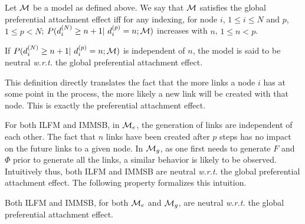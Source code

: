 \begin{definition}
Let $\mathcal{M}$ be a model as defined above. We say that $\mathcal{M}$ satisfies the global preferential attachment effect iff for any indexing, for node $i$, $1 \leq i \leq N$ and $p$, $1 \leq p < N$; 
$P(d_i^{(N)} \geq n+1 | d_i^{(p)} = n; \M)$ increases with $n$, $1 \leq n < p$.

If $P(d_i^{(N)} \geq n+1 | d_i^{(p)} = n; \M)$ is independent of $n$, the model is said to be neutral \textit{w.r.t.} the global preferential attachment effect.

\end{definition}

This definition directly translates the fact that the more links a node $i$ has at some point in the process, the more likely a new link will be created with that node. This is exactly the preferential attachment effect.

For both ILFM and IMMSB, in $\mathcal{M}_e$, the generation of links are independent of each other. The fact that $n$ links have been created after $p$ steps has no impact on the future links to a given node. In $\mathcal{M}_g$, as one first needs to generate $F$ and $\Phi$ prior to generate all the links, a similar behavior is likely to be observed. Intuitively thus, both ILFM and IMMSB are neutral \textit{w.r.t.} the global preferential attachment effect. The following property formalizes this intuition.


\begin{proposition} \label{th:mg_glob}
Both ILFM and IMMSB, for both $\mathcal{M}_e$ and $\mathcal{M}_g$, are neutral \textit{w.r.t.} the global preferential attachment effect.
\end{proposition}

